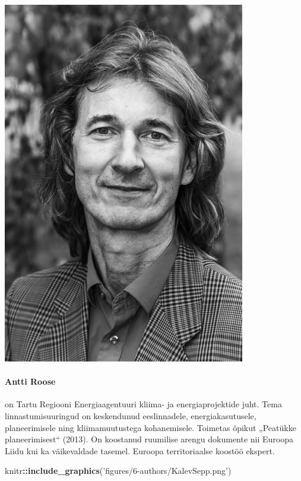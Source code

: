 \documentclass[estonian,]{article}
\newenvironment{Shaded}{\begin{snugshade}}{\end{snugshade}}
\newcommand{\KeywordTok}[1]{\textcolor[rgb]{0.13,0.29,0.53}{\textbf{#1}}}
\newcommand{\NormalTok}[1]{#1}
\newcommand{\OperatorTok}[1]{\textcolor[rgb]{0.81,0.36,0.00}{\textbf{#1}}}
\newcommand{\StringTok}[1]{\textcolor[rgb]{0.31,0.60,0.02}{#1}}
\let\oldparagraph\paragraph
\renewcommand{\paragraph}[1]{\oldparagraph{#1}\mbox{}}
\begin{document}
\begin{flushleft}\includegraphics[width=0.5\linewidth]{figures/6-authors/AnttiRoose} \end{flushleft}

\hypertarget{antti-roose}{%
\paragraph{Antti Roose}\label{antti-roose}}

on Tartu Regiooni Energiaagentuuri kliima- ja energiaprojektide juht. Tema linnastumisuuringud on keskendunud eeslinnadele, energiakasutusele, planeerimisele ning kliimamuutustega kohanemisele. Toimetas õpikut „Peatükke planeerimisest`` (2013). On koostanud ruumilise arengu dokumente nii Euroopa Liidu kui ka väikevaldade tasemel. Euroopa territoriaalse koostöö ekspert.

\begin{Shaded}
\begin{Highlighting}[]
\NormalTok{knitr}\OperatorTok{::}\KeywordTok{include_graphics}\NormalTok{(}\StringTok{'figures/6-authors/KalevSepp.png'}\NormalTok{)}
\end{Highlighting}
\end{Shaded}
\end{document}
